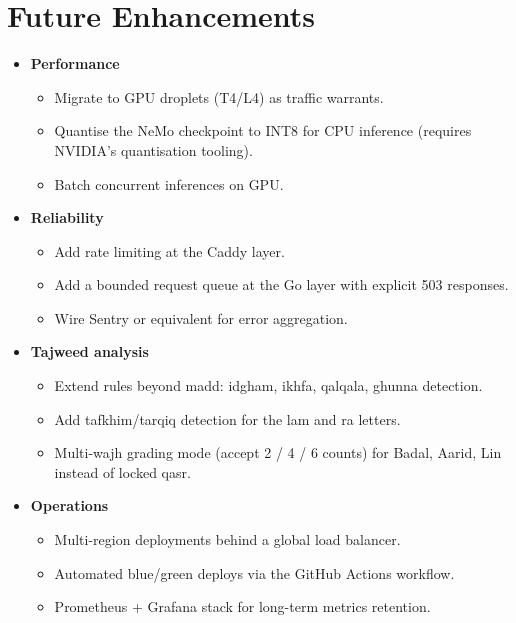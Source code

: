 \section{Future Enhancements}

\begin{goldbox}[title=Roadmap]
\begin{itemize}
  \item \textbf{Performance}
    \begin{itemize}
      \item Migrate to GPU droplets (T4/L4) as traffic warrants.
      \item Quantise the NeMo checkpoint to INT8 for CPU inference (requires NVIDIA's quantisation tooling).
      \item Batch concurrent inferences on GPU.
    \end{itemize}
  \item \textbf{Reliability}
    \begin{itemize}
      \item Add rate limiting at the Caddy layer.
      \item Add a bounded request queue at the Go layer with explicit 503 responses.
      \item Wire Sentry or equivalent for error aggregation.
    \end{itemize}
  \item \textbf{Tajweed analysis}
    \begin{itemize}
      \item Extend rules beyond madd: idgham, ikhfa, qalqala, ghunna detection.
      \item Add tafkhim/tarqiq detection for the lam and ra letters.
      \item Multi-wajh grading mode (accept 2 / 4 / 6 counts) for Badal, Aarid, Lin instead of locked qasr.
    \end{itemize}
  \item \textbf{Operations}
    \begin{itemize}
      \item Multi-region deployments behind a global load balancer.
      \item Automated blue/green deploys via the GitHub Actions workflow.
      \item Prometheus + Grafana stack for long-term metrics retention.
    \end{itemize}
\end{itemize}
\end{goldbox}


